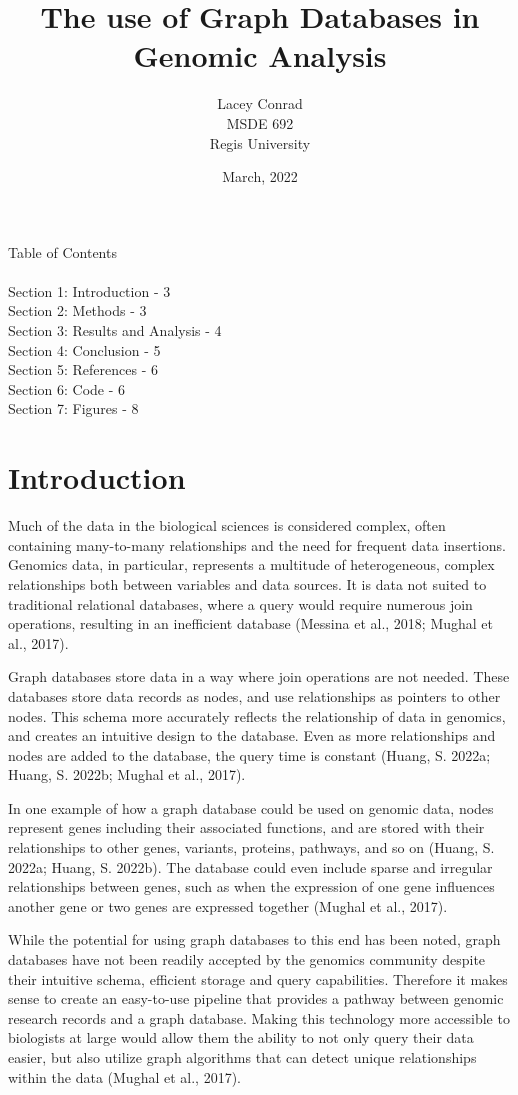 \documentclass[]{article}
\title{The use of Graph Databases in Genomic Analysis}
\author{Lacey Conrad\\MSDE 692\\ Regis University}
\date{March, 2022}
\begin{document}
	\maketitle
\pagebreak
\vspace{10mm}
{Table of Contents}\\
\\
Section 1: Introduction - 3\\
Section 2: Methods - 3\\
Section 3: Results and Analysis - 4\\
Section 4: Conclusion - 5\\
Section 5: References - 6\\
Section 6: Code - 6\\
Section 7: Figures - 8\\
\pagebreak

\section{Introduction}
Much of the data in the biological sciences is considered complex, often containing many-to-many relationships and the need for frequent data insertions. Genomics data, in particular, represents a multitude of heterogeneous, complex relationships both between variables and data sources. It is data not suited to traditional relational databases, where a query would require numerous join operations, resulting in an inefficient database (Messina et al., 2018; Mughal et al., 2017). 

Graph databases store data in a way where join operations are not needed.  These databases store data records as nodes, and use relationships as pointers to other nodes.  This schema more accurately reflects the relationship of data in genomics, and creates an intuitive design to the database. Even as more relationships and nodes are added to the database, the query time is constant (Huang, S. 2022a; Huang, S. 2022b; Mughal et al., 2017).  

In one example of how a graph database could be used on genomic data, nodes represent genes including their associated functions, and are stored with their relationships to other genes, variants, proteins, pathways, and so on (Huang, S. 2022a; Huang, S. 2022b). The database could even include sparse and irregular relationships between genes, such as when the expression of one gene influences another gene or two genes are expressed together (Mughal et al., 2017). 

While the potential for using graph databases to this end has been noted, graph databases have not been readily accepted by the genomics community despite their intuitive schema, efficient storage and query capabilities. Therefore it makes sense to create an easy-to-use pipeline that provides a pathway between genomic research records and a graph database. Making this technology more accessible to biologists at large would allow them the ability to not only query their data easier, but also utilize graph algorithms that can detect unique relationships within the data (Mughal et al., 2017).
\end{document}
